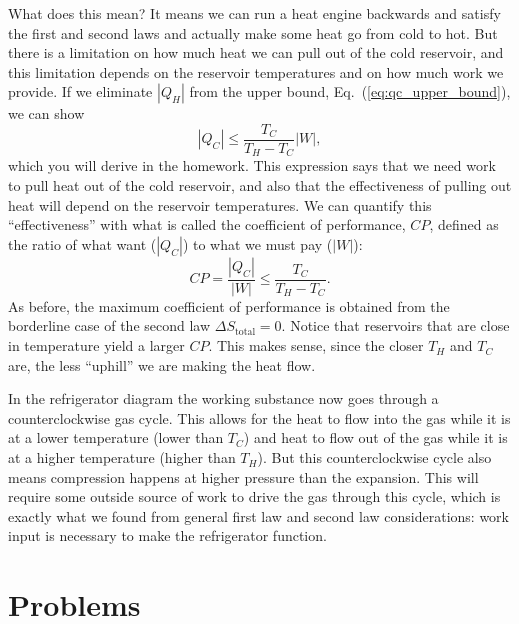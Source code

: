 What does this mean?  It means we can run a heat engine backwards and
satisfy the first and second laws and actually make some heat go from
cold to hot.  But there is a limitation on how much heat we can pull
out of the cold reservoir, and this limitation depends on the
reservoir temperatures and on how much work we provide.  If we
eliminate $|Q_H|$ from the upper bound, Eq.~(\ref{eq:qc_upper_bound}),
we can show
\begin{equation}
|Q_C| \leq \frac{T_C}{T_H-T_C} |W|,
\label{eq:qc_upper_bound_ii}
\end{equation}
which you will derive in the homework.  This expression says that we
need work to pull heat out of the cold reservoir, and also that the
effectiveness of pulling out heat will depend on the reservoir
temperatures.  We can quantify this ``effectiveness'' with what is
called the coefficient of performance, $CP$, defined as the ratio of
what want ($|Q_C|$) to what we must pay ($|W|$):
\begin{equation}
CP = \frac{|Q_C|}{|W|} \leq  \frac{T_C}{T_H-T_C}.
\end{equation}
As before, the maximum coefficient of performance is obtained from the
borderline case of the second law $\Delta S_\text{total}=0$.
Notice that reservoirs that are close in temperature yield a larger
$CP$.  This makes sense, since the closer $T_H$ and $T_C$ are, the
less ``uphill'' we are making the heat flow.

In the refrigerator diagram the working substance now goes
through a counterclockwise gas cycle.  This allows for the heat to
flow into the gas while it is at a lower temperature (lower than
$T_C$) and heat to flow out of the gas while it is at a higher
temperature (higher than $T_H$).  But this counterclockwise cycle also
means compression happens at higher pressure than the expansion.  This
will require some outside source of work to drive the gas through this
cycle, which is exactly what we found from general first law and
second law considerations: work input is necessary to make the
refrigerator function.



\newpage

\section*{Problems}

